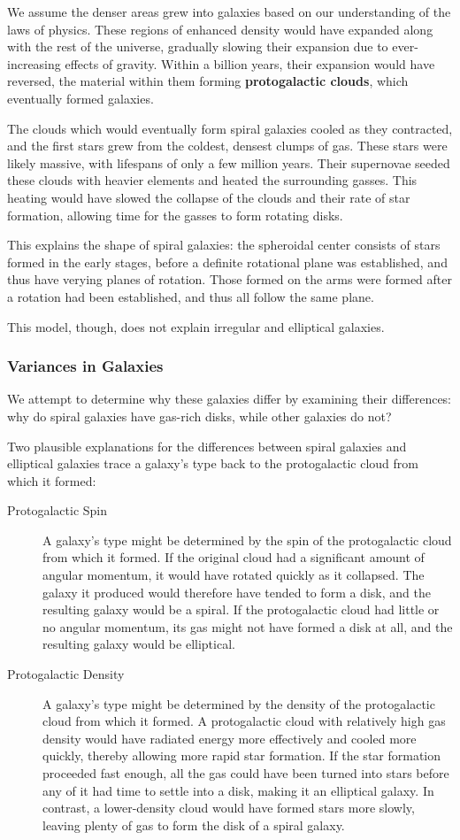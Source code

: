 \documentclass[12pt]{article}
\begin{document}
We assume the denser areas grew into galaxies based on our understanding of the laws of physics. These regions of enhanced density would have expanded along with the rest of the universe, gradually slowing their expansion due to ever-increasing effects of gravity. Within a billion years, their expansion would have reversed, the material within them forming {\bf protogalactic clouds}, which eventually formed galaxies.

The clouds which would eventually form spiral galaxies cooled as they contracted, and the first stars grew from the coldest, densest clumps of gas. These stars were likely massive, with lifespans of only a few million years. Their supernovae seeded these clouds with heavier elements and heated the surrounding gasses. This heating would have slowed the collapse of the clouds and their rate of star formation, allowing time for the gasses to form rotating disks.

This explains the shape of spiral galaxies: the spheroidal center consists of stars formed in the early stages, before a definite rotational plane was established, and thus have verying planes of rotation. Those formed on the arms were formed after a rotation had been established, and thus all follow the same plane.

This model, though, does not explain irregular and elliptical galaxies.

\subsubsection{Variances in Galaxies}
We attempt to determine why these galaxies differ by examining their differences: why do spiral galaxies have gas-rich disks, while other galaxies do not?

Two plausible explanations for the differences between spiral galaxies and elliptical galaxies trace a galaxy’s type back to the protogalactic cloud from which it formed:
\begin{description}
\item[Protogalactic Spin] A galaxy’s type might be determined by the spin of the protogalactic cloud from which it formed. If the original cloud had a significant amount of angular momentum, it would have rotated quickly as it collapsed. The galaxy it produced would therefore have tended to form a disk, and the resulting galaxy would be a spiral. If the protogalactic cloud had little or no angular momentum, its gas might not have formed a disk at all, and the resulting galaxy would be elliptical.
\item[Protogalactic Density] A galaxy’s type might be determined by the density of the protogalactic cloud from which it formed. A protogalactic cloud with relatively high gas density would have radiated energy more effectively and cooled more quickly, thereby allowing more rapid star formation. If the star formation proceeded fast enough, all the gas could have been turned into stars before any of it had time to settle into a disk, making it an elliptical galaxy. In contrast, a lower-density cloud would have formed stars more slowly, leaving plenty of gas to form the disk of a spiral galaxy.
\end{description}
\end{document}
